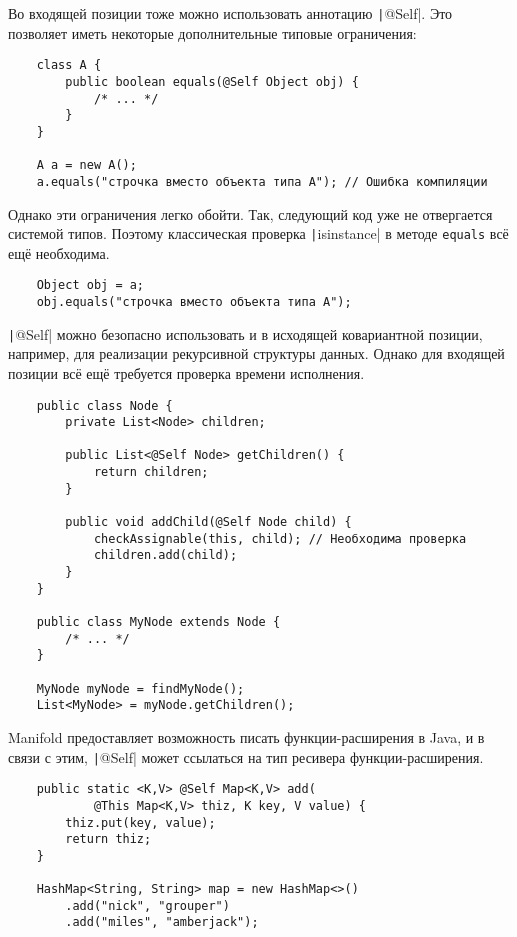 Во входящей позиции тоже можно использовать аннотацию \texttt|@Self|.
Это позволяет иметь некоторые дополнительные типовые ограничения:

\begin{verbatim}
    class A {
        public boolean equals(@Self Object obj) {
            /* ... */
        }
    }

    A a = new A();
    a.equals("строчка вместо объекта типа A"); // Ошибка компиляции
\end{verbatim}

Однако эти ограничения легко обойти.
Так, следующий код уже не отвергается системой типов.
Поэтому классическая проверка \texttt|isinstance| в методе \texttt{equals} всё ещё необходима.

\begin{verbatim}
    Object obj = a;
    obj.equals("строчка вместо объекта типа A");
\end{verbatim}

\texttt|@Self| можно безопасно использовать и в исходящей ковариантной позиции, например, для реализации рекурсивной структуры данных.
Однако для входящей позиции всё ещё требуется проверка времени исполнения.

\begin{verbatim}
    public class Node {
        private List<Node> children;

        public List<@Self Node> getChildren() {
            return children;
        }

        public void addChild(@Self Node child) {
            checkAssignable(this, child); // Необходима проверка
            children.add(child);
        }
    }

    public class MyNode extends Node {
        /* ... */
    }

    MyNode myNode = findMyNode();
    List<MyNode> = myNode.getChildren();
\end{verbatim}

Manifold предоставляет возможность писать функции-расширения в Java, и в связи с этим, \texttt|@Self| может ссылаться на тип ресивера функции-расширения.

\begin{verbatim}
    public static <K,V> @Self Map<K,V> add(
            @This Map<K,V> thiz, K key, V value) {
        thiz.put(key, value);
        return thiz;
    }

    HashMap<String, String> map = new HashMap<>()
        .add("nick", "grouper")
        .add("miles", "amberjack");
\end{verbatim}


